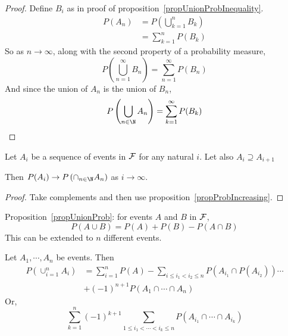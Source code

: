 \documentclass[../Main.tex]{subfiles}
\begin{document}
\begin{proof}
    Define $B_i$ as in proof of proposition~\ref{propUnionProbInequality}.
    \begin{align*}
        P(A_n) &= P\left(\bigcup_{k=1}^n B_k\right) \\
        &= \sum_{k=1}^{n} P(B_k)
    \end{align*}
    So as $n \to \infty$, along with the second property of a probability measure,
    \begin{equation*}
        P\left(\bigcup_{n=1}^\infty B_n \right) = \sum_{n=1}^{\infty} P(B_n)
    \end{equation*}
    And since the union of $A_n$ is the union of $B_n$,
    \begin{equation*}
        P\left(\bigcup_{n \in \N} A_n \right) = \sum_{k=1}^{\infty} P(B_k)
    \end{equation*}
\end{proof}
\begin{proposition}
    Let $A_i$ be a sequence of events in $\mathcal{F}$ for any natural $i$. Let also $A_i \supseteq A_{i+1}$\par
    Then $P(A_i) \to P\left(\cap_{n \in \N} A_n\right)$ as $i \to \infty$.
    \label{propProbDecreasing}
\end{proposition}
\begin{proof}
    Take complements and then use proposition~\ref{propProbIncreasing}.
\end{proof}
Proposition~\ref{propUnionProb}: for events $A$ and $B$ in $\mathcal{F}$,
\begin{equation*}
    P(A \cup B) = P(A) + P(B) - P(A \cap B)
\end{equation*}
This can be extended to $n$ different events.
\begin{theorem}
    Let $A_1, \cdots, A_n$ be events. Then
    \begin{align*}
        P\left(\cup_{i = 1}^n A_i\right) &= \sum_{i = 1}^n P(A) - \sum_{i \leq i_1 < i_2 \leq n} P(A_{i_1} \cap P(A_{i_2})) \cdots \\
        &+ (-1)^{n+1} P(A_1 \cap \cdots \cap A_n) 
    \end{align*}
    Or,
    \begin{equation}
        \sum_{k=1}^{n} (-1)^{k+1} \sum_{1 \leq i_1 < \cdots < i_k \leq n} P(A_{i_1} \cap \cdots \cap A_{i_k})
        \label{eqnInclusionExclusion}
    \end{equation}
    \label{thmInclusionExclusion}
\end{theorem}
\end{document}
